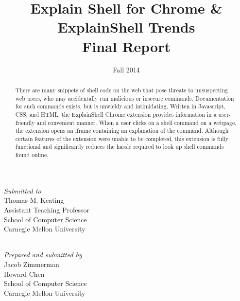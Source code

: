\documentclass[11pt]{article}
\title{Explain Shell for Chrome \& ExplainShell Trends\\Final Report}
\author{}
\date{Fall 2014}
\begin{document}


\thispagestyle{empty}
\maketitle
\thispagestyle{empty}

\begin{center}
  \textit{Submitted to} \\
  Thomas M. Keating \\
  Assistant Teaching Professor \\
  School of Computer Science \\
  Carnegie Mellon University

  \mbox{} \\

  \textit{Prepared and submitted by} \\
  Jacob Zimmerman \\
  Howard Chen \\
  School of Computer Science \\
  Carnegie Mellon University

  \mbox{} \\
\end{center}

\begin{abstract}
  There are many snippets of shell code on the web that pose threats to
  unsuspecting web users, who may accidentally run malicious or insecure
  commands. Documentation for such commands exists, but is unwieldy and
  intimidating. Written in Javascript, CSS, and HTML, the ExplainShell Chrome
  extension provides information in a user-friendly and convenient manner. When
  a user clicks on a shell command on a webpage, the extension opens an iframe
  containing an explanation of the command. Although certain features of the
  extension were unable to be completed, this extension is fully functional and
  significantly reduces the hassle required to look up shell commands found
  online.
\end{abstract}

\newpage

\tableofcontents

\newpage
\end{document}
